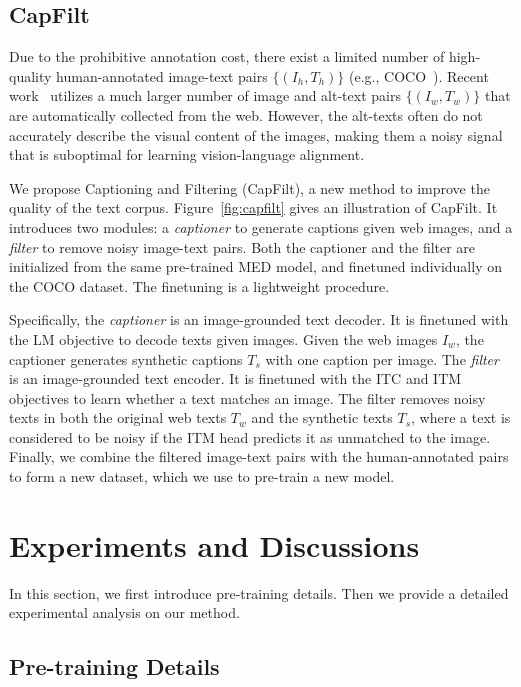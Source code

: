 \subsection{CapFilt}

Due to the prohibitive annotation cost, there exist a limited number of high-quality human-annotated image-text pairs $\{(I_h,T_h)\}$ (e.g., COCO~\cite{coco}). Recent work~\cite{ALBEF,simvlm} utilizes a much larger number of image and alt-text pairs $\{(I_w,T_w)\}$ that are automatically collected from the web. However, the alt-texts often do not accurately describe the visual content of the images, making them a noisy signal that is suboptimal for learning vision-language alignment. 

We propose Captioning and Filtering (CapFilt), a new method to improve the quality of the text corpus.
Figure~\ref{fig:capfilt} gives an illustration of CapFilt. It introduces two modules: a \textit{captioner} to generate captions given web images, and a \textit{filter} to remove noisy image-text pairs. Both the captioner and the filter are initialized from the same pre-trained MED model, and finetuned individually on the COCO dataset. The finetuning is a lightweight procedure.

Specifically, the \emph{captioner} is an image-grounded text decoder. It is finetuned with the LM objective to decode texts given images. Given the web images $I_w$, the captioner generates synthetic captions $T_s$ with one caption per image. The \emph{filter} is an image-grounded text encoder. It is finetuned with the ITC and ITM objectives to learn whether a text matches an image. The filter removes noisy texts in both the original web texts $T_w$ and the synthetic texts $T_s$, where a text is considered to be noisy if the ITM head predicts it as unmatched to the image. Finally, we combine the filtered image-text pairs with the human-annotated pairs to form a new dataset, which we use to pre-train a new model.

\section{Experiments and Discussions}
\label{sec:experiment}
In this section, we first introduce pre-training details. Then we provide a detailed experimental analysis on our method.

\subsection{Pre-training Details}

